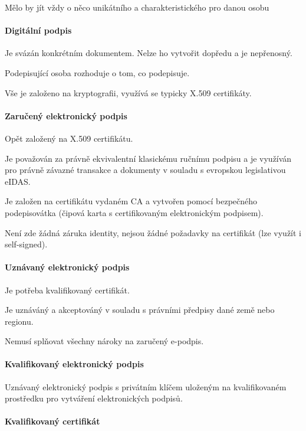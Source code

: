 \documentclass[10pt,a4paper]{article}
\begin{document}
Mělo by jít vždy o něco unikátního a charakteristického pro danou osobu

\paragraph{Digitální podpis}

Je svázán konkrétním dokumentem. Nelze ho vytvořit dopředu a je nepřenosný.

Podepisující osoba rozhoduje o tom, co podepisuje.

Vše je založeno na kryptografii, využívá se typicky X.509 certifikáty.

\paragraph{Zaručený elektronický podpis}

Opět založený na X.509 certifikátu. 

Je považován za právně ekvivalentní klasickému ručnímu podpisu a je využíván pro právně závazné transakce a dokumenty v souladu s evropskou legislativou eIDAS.

Je založen na certifikátu vydaném CA a vytvořen pomocí bezpečného podepisovátka (čipová karta s certifikovaným elektronickým podpisem). 


Není zde žádná záruka identity, nejsou žádné požadavky na certifikát (lze využít i self-signed).


\paragraph{Uznávaný elektronický podpis}

Je potřeba kvalifikovaný certifikát.

Je uznáváný a akceptováný v souladu s právními předpisy dané země nebo regionu. 

Nemusí splňovat všechny nároky na zaručený e-podpis. 

\paragraph{Kvalifikovaný elektronický podpis}

Uznávaný elektronický podpis s privátním klíčem uloženým na kvalifikovaném prostředku pro vytváření elektronických podpisů.

\paragraph{Kvalifikovaný certifikát}
\end{document}
